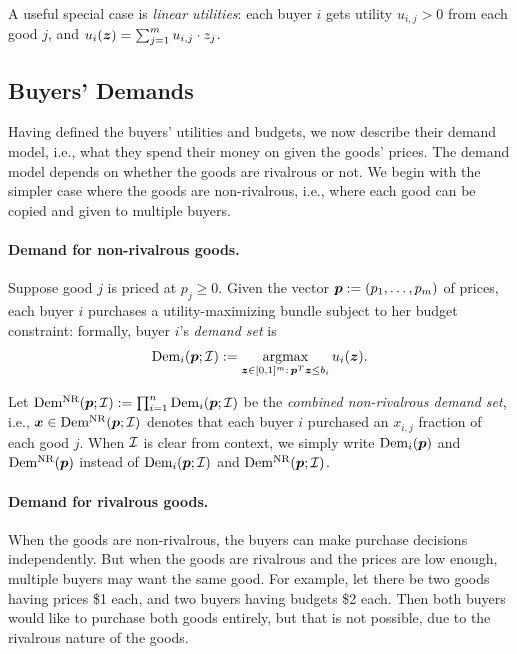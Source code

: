 A useful special case is \emph{linear utilities}:
each buyer $i$ gets utility $u_{i,j} > 0$ from each good $j$,
and $u_i(\bm{z}) = \sum_{j=1}^m u_{i,j} \cdot z_j$.

\subsection{Buyers' Demands}

Having defined the buyers' utilities and budgets, we now describe their demand model, i.e., what they spend their money on given the goods' prices. The demand model depends on whether the goods are rivalrous or not. We begin with the simpler case where the goods are non-rivalrous, i.e., where each good can be copied and given to multiple buyers.

\paragraph{Demand for non-rivalrous goods.}
Suppose good $j$ is priced at $p_j \ge 0$.
Given the vector $\bm{p} := (p_1, \ldots, p_m)$ of prices,
each buyer $i$ purchases a utility-maximizing bundle subject to her budget constraint:
formally, buyer $i$'s \emph{demand set} is
\[ \operatorname{Dem}_i(\bm{p}; \mathcal{I}) := \operatorname*{argmax}_{\bm{z} \in [0, 1]^m:\,\bm{p}^T\bm{z} \le b_i} u_i(\bm{z}). \]
%

%
Let $\operatorname{Dem^{\mathrm{NR}}}(\bm{p}; \mathcal{I}) := \prod_{i=1}^n \operatorname{Dem}_i(\bm{p}; \mathcal{I})$ be the
\emph{combined non-rivalrous demand set}, i.e.,
$\bm{x} \in \operatorname{Dem^{\mathrm{NR}}}(\bm{p}; \mathcal{I})$ denotes that each buyer $i$ purchased an $x_{i,j}$ fraction of each good $j$.
When $\mathcal{I}$ is clear from context, we simply write $\operatorname{Dem}_i(\bm{p})$ and $\operatorname{Dem^{\mathrm{NR}}}(\bm{p})$
instead of $\operatorname{Dem}_i(\bm{p}; \mathcal{I})$ and $\operatorname{Dem^{\mathrm{NR}}}(\bm{p}; \mathcal{I})$.

\paragraph{Demand for rivalrous goods.}
When the goods are non-rivalrous, the buyers can make purchase decisions independently.
But when the goods are rivalrous and the prices are low enough, multiple buyers may want the same good.
For example, let there be two goods having prices \$1 each, and two buyers having budgets \$2 each.
Then both buyers would like to purchase both goods entirely, but that is not possible, due to the rivalrous nature of the goods.

